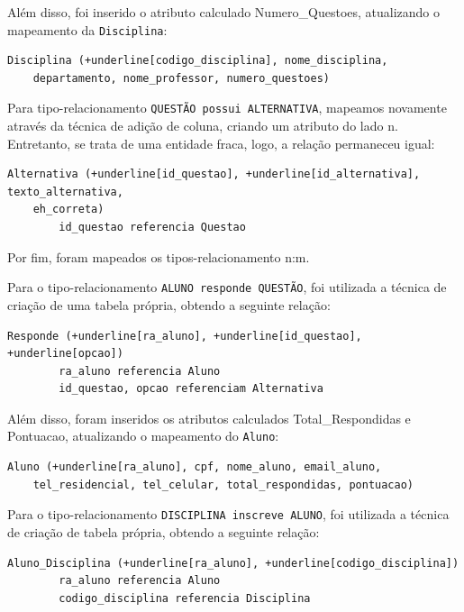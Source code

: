 \documentclass[12pt,a4paper]{article}
\begin{document}
Além disso, foi inserido o atributo calculado Numero\_Questoes, atualizando o mapeamento da \texttt{Disciplina}:

\begin{Verbatim}[commandchars=+\[\]]
    Disciplina (+underline[codigo_disciplina], nome_disciplina,
    departamento, nome_professor, numero_questoes)
\end{Verbatim}

Para tipo-relacionamento \texttt{QUESTÃO possui ALTERNATIVA}, mapeamos novamente através da técnica de adição de coluna, criando um atributo do lado n. Entretanto, se trata de uma entidade fraca, logo, a relação permaneceu igual:

\begin{Verbatim}[commandchars=+\[\]]
    Alternativa (+underline[id_questao], +underline[id_alternativa], texto_alternativa, 
    eh_correta)
        id_questao referencia Questao
\end{Verbatim}

Por fim, foram mapeados os tipos-relacionamento n:m.

Para o tipo-relacionamento \texttt{ALUNO responde QUESTÃO}, foi utilizada a técnica de criação de uma tabela própria, obtendo a seguinte relação:

\begin{Verbatim}[commandchars=+\[\]]
    Responde (+underline[ra_aluno], +underline[id_questao], +underline[opcao])
        ra_aluno referencia Aluno
        id_questao, opcao referenciam Alternativa
\end{Verbatim}

Além disso, foram inseridos os atributos calculados Total\_Respondidas e Pontuacao, atualizando o mapeamento do \texttt{Aluno}:

\begin{Verbatim}[commandchars=+\[\]]
    Aluno (+underline[ra_aluno], cpf, nome_aluno, email_aluno, 
    tel_residencial, tel_celular, total_respondidas, pontuacao)
\end{Verbatim}

Para o tipo-relacionamento \texttt{DISCIPLINA inscreve ALUNO}, foi utilizada a técnica de criação de tabela própria, obtendo a seguinte relação:

\begin{Verbatim}[commandchars=+\[\]]
    Aluno_Disciplina (+underline[ra_aluno], +underline[codigo_disciplina])
        ra_aluno referencia Aluno
        codigo_disciplina referencia Disciplina
\end{Verbatim}
\end{document}
